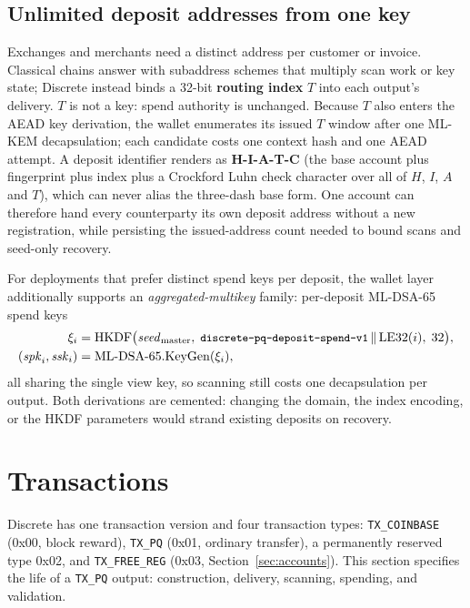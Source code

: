 \documentclass[11pt,a4paper]{article}
\newcommand{\code}[1]{\texttt{\small #1}}
\newcommand{\HKDF}{\mathrm{HKDF}}
\newcommand{\DSA}{\mathrm{ML\text{-}DSA\text{-}65}}
\newcommand{\concat}{\,\|\,}
\begin{document}
\subsection{Unlimited deposit addresses from one key}\label{sec:deposits}

Exchanges and merchants need a distinct address per customer or invoice.
Classical chains answer with subaddress schemes that multiply scan work or
key state; Discrete instead binds a 32-bit \textbf{routing index} $T$ into
each output's delivery. $T$ is not a key: spend authority is unchanged. Because
$T$ also enters the AEAD key derivation, the wallet enumerates its issued $T$
window after one ML-KEM decapsulation; each candidate costs one context hash and
one AEAD attempt. A deposit identifier renders as
\textbf{H-I-A-T-C} (the base account plus fingerprint plus index plus a Crockford
Luhn check character over all of $H$, $I$, $A$ and $T$), which can never alias the
three-dash base form. One account
can therefore hand every counterparty its own deposit address without a new
registration, while persisting the issued-address count needed to bound scans
and seed-only recovery.

For deployments that prefer distinct spend keys per deposit, the wallet layer
additionally supports an \emph{aggregated-multikey} family: per-deposit
ML-DSA-65 spend keys
\begin{equation}
\begin{split}
\xi_i &= \HKDF\bigl(\mathit{seed}_{\mathrm{master}},\;
\text{\code{discrete-pq-deposit-spend-v1}} \concat \mathrm{LE32}(i),\; 32\bigr),\\
(\mathit{spk}_i, \mathit{ssk}_i) &= \DSA.\mathrm{KeyGen}(\xi_i),
\end{split}
\end{equation}
all sharing the single view key, so scanning still costs one decapsulation
per output. Both derivations are cemented: changing the domain, the index
encoding, or the HKDF parameters would strand existing deposits on recovery.

\section{Transactions}\label{sec:tx}

Discrete has one transaction version and four transaction types:
\code{TX\_COINBASE} (0x00, block reward), \code{TX\_PQ} (0x01, ordinary
transfer), a permanently reserved type 0x02, and \code{TX\_FREE\_REG} (0x03,
Section~\ref{sec:accounts}). This section specifies the life of a
\code{TX\_PQ} output: construction, delivery, scanning, spending, and
validation.
\end{document}
